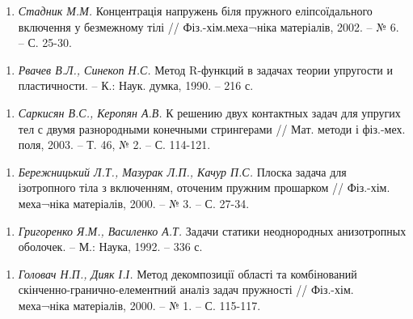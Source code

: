 \begin{enumerate}
\def\labelenumi{\arabic{enumi}.}
\tightlist
\item
  \protect\hypertarget{anchor-16}{}{}\emph{Стадник М.М.} Концентрація
  напружень біля пружного еліпсоїдального включення у безмежному тілі //
  Фіз.-хім.меха¬ніка матеріалів, 2002. -- № 6. -- С. 25-30.
\end{enumerate}

\begin{enumerate}
\def\labelenumi{\arabic{enumi}.}
\tightlist
\item
  \protect\hypertarget{anchor-17}{}{}\emph{Рвачев В.Л., Синекоп Н.С.}
  Метод R-функций в задачах теории упругости и пластичности. -- К.:
  Наук. думка, 1990. -- 216 с.
\end{enumerate}

\begin{enumerate}
\def\labelenumi{\arabic{enumi}.}
\tightlist
\item
  \protect\hypertarget{anchor-18}{}{}\emph{Саркисян В.С., Керопян А.В.}
  К решению двух контактных задач для упругих тел с двумя разнородными
  конечными стрингерами // Мат. методи і фіз.-мех. поля, 2003. -- Т. 46,
  № 2. -- С. 114-121.
\end{enumerate}

\begin{enumerate}
\def\labelenumi{\arabic{enumi}.}
\tightlist
\item
  \protect\hypertarget{anchor-19}{}{}\emph{Бережницький Л.Т., Мазурак
  Л.П., Качур П.С.} Плоска задача для ізотропного тіла з включенням,
  оточеним пружним прошарком // Фіз.-хім. меха¬ніка матеріалів, 2000. --
  № 3. -- С. 27-34.
\end{enumerate}

\begin{enumerate}
\def\labelenumi{\arabic{enumi}.}
\tightlist
\item
  \protect\hypertarget{anchor-20}{}{}\emph{Григоренко Я.М., Василенко
  А.Т.} Задачи статики неоднородных анизотропных оболочек. -- М.: Наука,
  1992. -- 336 с.
\end{enumerate}

\begin{enumerate}
\def\labelenumi{\arabic{enumi}.}
\tightlist
\item
  \protect\hypertarget{anchor-21}{}{}\emph{Головач Н.П., Дияк І.І.}
  Метод декомпозиції області та комбінований
  скінченно-гранично-елементний аналіз задач пружності // Фіз.-хім.
  меха¬ніка матеріалів, 2000. -- № 1. -- С. 115-117.
\end{enumerate}

